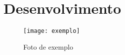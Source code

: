 \chapter{Desenvolvimento}

\blindtext

\begin{figure}[h]
	\centering
	\caption{Foto de exemplo}
	\texttt{[image: exemplo]}
	\label{fig:exemplo}
\end{figure}

\blindenumerate[10]
\blindtext[5]
